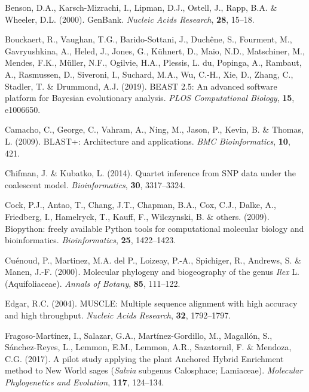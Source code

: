 \documentclass[]{article}
\begin{document}
\leavevmode\hypertarget{ref-benson2000genbank}{}%
Benson, D.A., Karsch-Mizrachi, I., Lipman, D.J., Ostell, J., Rapp, B.A. \& Wheeler, D.L. (2000). GenBank. \emph{Nucleic Acids Research}, \textbf{28}, 15--18.

\leavevmode\hypertarget{ref-bouckaert2019beast}{}%
Bouckaert, R., Vaughan, T.G., Barido-Sottani, J., Duchêne, S., Fourment, M., Gavryushkina, A., Heled, J., Jones, G., Kühnert, D., Maio, N.D., Matschiner, M., Mendes, F.K., Müller, N.F., Ogilvie, H.A., Plessis, L. du, Popinga, A., Rambaut, A., Rasmussen, D., Siveroni, I., Suchard, M.A., Wu, C.-H., Xie, D., Zhang, C., Stadler, T. \& Drummond, A.J. (2019). BEAST 2.5: An advanced software platform for Bayesian evolutionary analysis. \emph{PLOS Computational Biology}, \textbf{15}, e1006650.

\leavevmode\hypertarget{ref-camacho2009blast}{}%
Camacho, C., George, C., Vahram, A., Ning, M., Jason, P., Kevin, B. \& Thomas, L. (2009). BLAST+: Architecture and applications. \emph{BMC Bioinformatics}, \textbf{10}, 421.

\leavevmode\hypertarget{ref-chifman2014quartet}{}%
Chifman, J. \& Kubatko, L. (2014). Quartet inference from SNP data under the coalescent model. \emph{Bioinformatics}, \textbf{30}, 3317--3324.

\leavevmode\hypertarget{ref-cock2009biopython}{}%
Cock, P.J., Antao, T., Chang, J.T., Chapman, B.A., Cox, C.J., Dalke, A., Friedberg, I., Hamelryck, T., Kauff, F., Wilczynski, B. \& others. (2009). Biopython: freely available Python tools for computational molecular biology and bioinformatics. \emph{Bioinformatics}, \textbf{25}, 1422--1423.

\leavevmode\hypertarget{ref-cuenoud2000molecular}{}%
Cuénoud, P., Martinez, M.A. del P., Loizeay, P.-A., Spichiger, R., Andrews, S. \& Manen, J.-F. (2000). Molecular phylogeny and biogeography of the genus \emph{Ilex} L.(Aquifoliaceae). \emph{Annals of Botany}, \textbf{85}, 111--122.

\leavevmode\hypertarget{ref-edgar2004muscle}{}%
Edgar, R.C. (2004). MUSCLE: Multiple sequence alignment with high accuracy and high throughput. \emph{Nucleic Acids Research}, \textbf{32}, 1792--1797.

\leavevmode\hypertarget{ref-fragoso2017pilot}{}%
Fragoso-Martínez, I., Salazar, G.A., Martínez-Gordillo, M., Magallón, S., Sánchez-Reyes, L., Lemmon, E.M., Lemmon, A.R., Sazatornil, F. \& Mendoza, C.G. (2017). A pilot study applying the plant Anchored Hybrid Enrichment method to New World sages (\emph{Salvia} subgenus Calosphace; Lamiaceae). \emph{Molecular Phylogenetics and Evolution}, \textbf{117}, 124--134.
\end{document}
